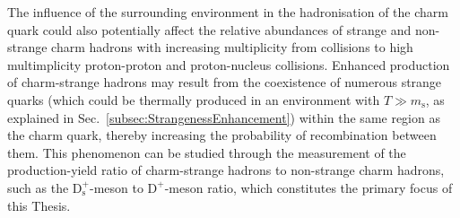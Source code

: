 The influence of the surrounding environment in the hadronisation of the charm quark could also potentially affect the relative abundances of strange and non-strange charm hadrons with increasing multiplicity from  \ee collisions to high multimplicity proton-proton and proton-nucleus collisions. Enhanced production of charm-strange hadrons may result from the coexistence of numerous strange quarks (which could be thermally produced in an environment with $T \gg m_\mathrm{s}$, as explained in Sec.~\ref{subsec:StrangenessEnhancement}) within the same region as the charm quark, thereby increasing the probability of recombination between them. This phenomenon can be studied through the measurement of the production-yield ratio of charm-strange hadrons to non-strange charm hadrons, such as the $\mathrm{D_s^+}$-meson to $\mathrm{D^+}$-meson ratio, which constitutes the primary focus of this Thesis.